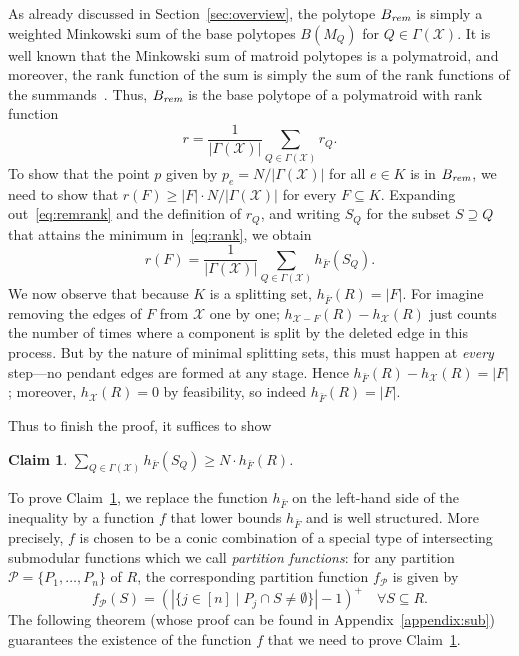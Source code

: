\documentclass[11pt, letterpaper]{article}
\newtheorem{claim}[theorem]{Claim}
\theoremstyle{definition}
\newcommand{\todo}[1]{}
\newcommand{\todo}[1]{{\color{blue}\emph{(#1)}}}
\newcommand{\grphx}{\mathcal{X}}
\newcommand{\compof}[1]{\Gamma(#1)}
\newcommand{\compx}{\compof{\grphx}}
\newcommand{\slk}{h}
\newcommand{\slkx}{h_{\grphx}}
\newcommand{\slkF}{h_{\bar{F}}}
\newcommand{\remove}{-}
\newcommand{\core}{K}
\newcommand{\remP}{B_{\text{\it rem}}}
\newcommand{\card}[1]{\lvert#1\rvert}
\begin{document}
	As already discussed in Section~\ref{sec:overview}, the polytope $\remP$ is simply a weighted Minkowski sum of the base polytopes $B(M_Q)$ for $Q \in \compx$.
	It is well known that the Minkowski sum of matroid polytopes is a polymatroid, and moreover, the rank function of the sum is simply the sum of the rank functions of the summands~\cite{mcdiarmid_1975_rados}. Thus, $\remP$ is the base polytope of a polymatroid with rank function
	\begin{equation}\label{eq:remrank} 
		r = \frac{1}{\card{\compx}}\sum_{Q \in \compx}r_Q. 
	\end{equation}
	To show that the point $p$ given by $p_e = N/\card{\compx}$ for all $e \in \core$ is in $\remP$, we need to show that $r(F) \geq \card{F}\cdot N/\card{\compx}$ for every $F \subseteq \core$.
	Expanding out~\eqref{eq:remrank} and the definition of $r_Q$, and writing $S_Q$ for the subset $S \supseteq Q$ that attains the minimum in~\eqref{eq:rank}, we obtain
	\[ r(F) = \frac{1}{\card{\compx}}\sum_{Q \in \compx} \slkF(S_Q). \]
	We now observe that because $\core$ is a splitting set, $\slkF(R) = \card{F}$. 
	For imagine removing the edges of $F$ from $\grphx$ one by one; $\slk_{\grphx \remove F}(R) - \slkx(R)$ just counts the number of times where a component is split by the deleted edge in this process. But by the nature of minimal splitting sets, this must happen at \emph{every} step---no pendant edges are formed at any stage. Hence $\slkF(R) - \slkx(R) = \card{F}$; moreover, $\slkx(R) = 0$ by feasibility, so indeed $\slkF(R) = \card{F}$.
\todo{Explain this better.}
	Thus to finish the proof, it suffices to show
	\begin{claim}\label{claim:missing}
		$\sum_{Q \in \compx} \slkF(S_Q) \geq N \cdot \slkF(R)$.
	\end{claim}
To prove Claim~\ref{claim:missing}, we replace the function $\slkF$
on the left-hand side of the inequality by a
function $f$ that lower bounds $\slkF$ and is well structured.
More precisely, $f$ is chosen to be a conic combination of a special type
of intersecting submodular functions which we call
\emph{partition functions}:
for any partition
$\mathcal{P}=\{P_1,\dots, P_n\}$ of $R$, the
corresponding partition function $f_{\mathcal{P}}$ is given by 
\begin{equation*}
f_{\mathcal{P}}(S) =
  \left(|\{j\in [n] \mid P_j\cap S \neq \emptyset\}|-1\right)^+\quad \forall S\subseteq R.
\end{equation*}
The following theorem (whose proof can be found in Appendix~\ref{appendix:sub})
guarantees the existence of the function $f$ that we need to
prove Claim~\ref{claim:missing}.
\end{document}
